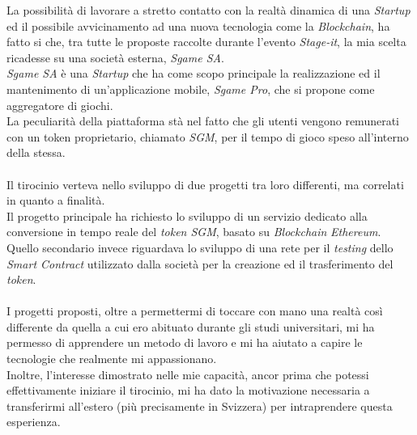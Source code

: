 \documentclass[11pt]{thesistemp}
\begin{document}
La possibilità di lavorare a stretto contatto con la realtà dinamica di una \textit{Startup} ed il possibile avvicinamento ad una nuova tecnologia come la \textit{Blockchain}, ha fatto si che, tra tutte le proposte raccolte durante l'evento \textit{Stage-it}, la mia scelta ricadesse su una società esterna, \textit{Sgame SA}.\\
\textit{Sgame SA} è una \textit{Startup} che ha come scopo principale la realizzazione ed il mantenimento di un'applicazione mobile, \textit{Sgame Pro}, che si propone come aggregatore di giochi.\\
La peculiarità della piattaforma stà nel fatto che gli utenti vengono remunerati con un token proprietario, chiamato \textit{SGM}, per il tempo di gioco speso all'interno della stessa.\\\\
Il tirocinio verteva nello sviluppo di due progetti tra loro differenti, ma correlati in quanto a finalità.\\
Il progetto principale ha richiesto lo sviluppo di un servizio dedicato alla conversione in tempo reale del \textit{token SGM}, basato su \textit{Blockchain} \textit{Ethereum}.\\
Quello secondario invece riguardava lo sviluppo di una rete per il \textit{testing} dello \textit{Smart Contract} utilizzato dalla società per la creazione ed il trasferimento del \textit{token}.\\\\
I progetti proposti, oltre a permettermi di toccare con mano una realtà così differente da quella a cui ero abituato durante gli studi universitari, mi ha permesso di apprendere un metodo di lavoro e mi ha aiutato a capire le tecnologie che realmente mi appassionano.\\
Inoltre, l'interesse dimostrato nelle mie capacità, ancor prima che potessi effettivamente iniziare il tirocinio, mi ha dato la motivazione necessaria a transferirmi all'estero (più precisamente in Svizzera) per intraprendere questa esperienza.\\
\pagebreak
\end{document}
